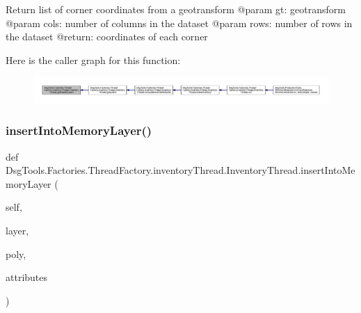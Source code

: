 \begin{DoxyVerb}Return list of corner coordinates from a geotransform
    @param gt: geotransform
    @param cols: number of columns in the dataset
    @param rows: number of rows in the dataset
    @return:   coordinates of each corner
\end{DoxyVerb}
 Here is the caller graph for this function\+:
\nopagebreak
\begin{figure}[H]
\begin{center}
\leavevmode
\includegraphics[width=350pt]{class_dsg_tools_1_1_factories_1_1_thread_factory_1_1inventory_thread_1_1_inventory_thread_a6fa65de4be1523486c67c51a95b0bd8c_icgraph}
\end{center}
\end{figure}
\mbox{\label{class_dsg_tools_1_1_factories_1_1_thread_factory_1_1inventory_thread_1_1_inventory_thread_a9e240e481365cbe1a7de2450655503e3}} 
\subsubsection{\texorpdfstring{insert\+Into\+Memory\+Layer()}{insertIntoMemoryLayer()}}
{\footnotesize\ttfamily def Dsg\+Tools.\+Factories.\+Thread\+Factory.\+inventory\+Thread.\+Inventory\+Thread.\+insert\+Into\+Memory\+Layer (\begin{DoxyParamCaption}\item[{}]{self,  }\item[{}]{layer,  }\item[{}]{poly,  }\item[{}]{attributes }\end{DoxyParamCaption})}

